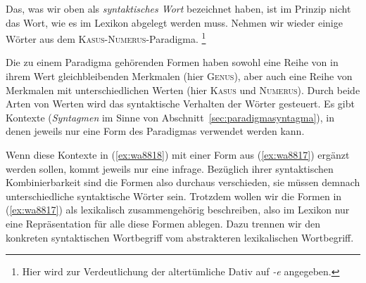 \label{sec:woerterwortformen}

Das, was wir oben als \textit{syntaktisches Wort} bezeichnet haben, ist im Prinzip nicht das Wort, wie es im Lexikon abgelegt werden muss.
Nehmen wir wieder einige Wörter aus dem \textsc{Kasus}-\textsc{Numerus}-Paradigma.%
\footnote{Hier wird zur Verdeutlichung der altertümliche Dativ auf \textit{-e} angegeben.}

\begin{exe}
  \ex\label{ex:wa8817}
  \begin{xlist}
  \end{xlist}
\end{exe}

Die zu einem Paradigma gehörenden Formen haben sowohl eine Reihe von in ihrem Wert gleichbleibenden Merkmalen (hier \textsc{Genus}), aber auch eine Reihe von Merkmalen mit unterschiedlichen Werten (hier \textsc{Kasus} und \textsc{Numerus}).
Durch beide Arten von Werten wird das syntaktische Verhalten der Wörter gesteuert.
Es gibt Kontexte (\textit{Syntagmen} im Sinne von Abschnitt~\ref{sec:paradigmasyntagma}), in denen jeweils nur eine Form des Paradigmas verwendet werden kann.

\begin{exe}
  \ex\label{ex:wa8818}
  \begin{xlist}
  \end{xlist}
\end{exe}

Wenn diese Kontexte in (\ref{ex:wa8818}) mit einer Form aus (\ref{ex:wa8817}) ergänzt werden sollen, kommt jeweils nur eine infrage.
Bezüglich ihrer syntaktischen Kombinierbarkeit sind die Formen also durchaus verschieden, sie müssen demnach unterschiedliche syntaktische Wörter sein. 
Trotzdem wollen wir die Formen in (\ref{ex:wa8817}) als lexikalisch zusammengehörig beschreiben, also im Lexikon nur eine Repräsentation für alle diese Formen ablegen.
Dazu trennen wir den konkreten syntaktischen Wortbegriff vom abstrakteren lexikalischen Wortbegriff.

